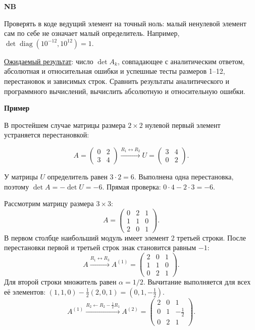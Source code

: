 \documentclass[12pt,a4paper]{article}
\newcommand{\taskhead}[1]{\par\textbf{#1}\par}
\newenvironment{notabene}
  {\par\medskip
   \begin{lrbox}{\nbbox}%
   \begin{minipage}{\dimexpr\linewidth-20pt\relax}
   {\fontsize{13}{16}\selectfont\bfseries
    \color{black!85}NB\par}
   \vspace{4pt}
   \noindent\ignorespaces}
  {\par\end{minipage}%
   \end{lrbox}%
   \noindent
   \begingroup
   \setlength{\fboxsep}{10pt}%
   \colorbox{blue!5}{\usebox{\nbbox}}%
   \endgroup
   \par\medskip}
\begin{document}
\begin{notabene}
Проверять в коде ведущий элемент на точный ноль: малый ненулевой элемент
сам по себе не означает малый определитель. Например,
$\det\operatorname{diag}(10^{-12},10^{12})=1$.
\end{notabene}

\underline{Ожидаемый результат}: число $\det A_k$, совпадающее с аналитическим ответом,
абсолютная и относительная ошибки и успешные тесты размеров 1--12, перестановок и зависимых строк.
Сравнить результаты аналитического и программного вычислений, вычислить абсолютную и относительную ошибки.

\taskhead{Пример}
В простейшем случае матрицы размера $2\times 2$ нулевой первый элемент устраняется перестановкой:

\[
A=\begin{pmatrix}0&2\\3&4\end{pmatrix}
\xrightarrow{R_1\leftrightarrow R_2}
U=\begin{pmatrix}3&4\\0&2\end{pmatrix}.
\]

У матрицы $U$ определитель равен $3\cdot2=6$. Выполнена одна перестановка,
поэтому $\det A=-\det U=-6$. Прямая проверка: $0\cdot4-2\cdot3=-6$.

Рассмотрим матрицу размера $3\times 3$:
\[
A=\begin{pmatrix}0&2&1\\1&1&0\\2&0&1\end{pmatrix}.
\]
В первом столбце наибольший модуль имеет элемент 2 третьей строки.
После перестановки первой и третьей строк знак становится равным $-1$:
\[
A\xrightarrow{R_1\leftrightarrow R_3}
A^{(1)}=\begin{pmatrix}2&0&1\\1&1&0\\0&2&1\end{pmatrix}.
\]
Для второй строки множитель равен $\alpha=1/2$. Вычитание выполняется
для всех её элементов: $(1,1,0)-\tfrac12(2,0,1)=(0,1,-\tfrac12)$.
\[
A^{(1)}\xrightarrow{R_2\gets R_2-\frac12R_1}
A^{(2)}=\begin{pmatrix}2&0&1\\0&1&-\frac12\\0&2&1\end{pmatrix}.
\]

\newpage
\end{document}
